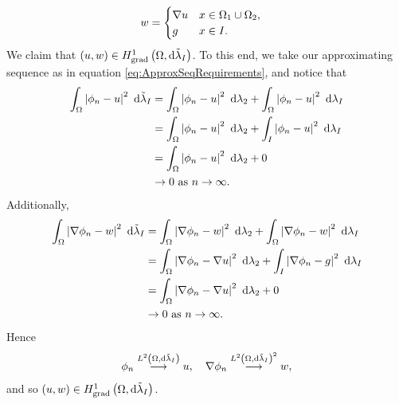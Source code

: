 \documentclass[11pt]{report}
\theoremstyle{plain}
\newcommand{\tlambda}{\tilde{\lambda}}
\begin{document}
\begin{enumerate}
	\begin{align}
		w &= \begin{cases} \nabla u & x\in\Omega_1 \cup \Omega_2, \\ g & x\in I. \end{cases}
	\end{align}
	We claim that $\bracs{u,w}\in\gradSob{\ddom}{\tlambda_I}$.
	To this end, we take our approximating sequence as in equation \eqref{eq:ApproxSeqRequirements}, and notice that
	\begin{subequations}
		\begin{align}
			\integral{\ddom}{\abs{\phi_n - u}^2}{\tlambda_I}
			&= \integral{\ddom}{\abs{\phi_n - u}^2}{\lambda_2} + \integral{\ddom}{\abs{\phi_n - u}^2}{\lambda_I} \\
			&= \integral{\ddom}{\abs{\phi_n - u}^2}{\lambda_2} + \integral{I}{\abs{\phi_n - u}^2}{\lambda_I} \\
			&= \integral{\ddom}{\abs{\phi_n - u}^2}{\lambda_2} + 0 \\
			&\rightarrow 0 \toInfty{n}.
		\end{align}
	\end{subequations}
	Additionally,
	\begin{subequations}
		\begin{align}
			\integral{\ddom}{\abs{\grad\phi_n - w}^2}{\tlambda_I}
			&= \integral{\ddom}{\abs{\grad\phi_n - w}^2}{\lambda_2} + \integral{\ddom}{\abs{\grad\phi_n - w}^2}{\lambda_I} \\
			&= \integral{\ddom}{\abs{\grad\phi_n - \grad u}^2}{\lambda_2} + \integral{I}{\abs{\grad\phi_n - g}^2}{\lambda_I} \\
			&= \integral{\ddom}{\abs{\grad\phi_n - \grad u}^2}{\lambda_2} + 0 \\
			&\rightarrow 0 \toInfty{n}.
		\end{align}
	\end{subequations}
	Hence
	\begin{align}
		\phi_n \lconv{\ltwo{\ddom}{\tlambda_I}} u, \quad \grad\phi_n \lconv{\ltwo{\ddom}{\tlambda_I}^2} w,
	\end{align}
	and so $\bracs{u,w}\in\gradSob{\ddom}{\tlambda_I}$.
\end{enumerate}
\end{document}
